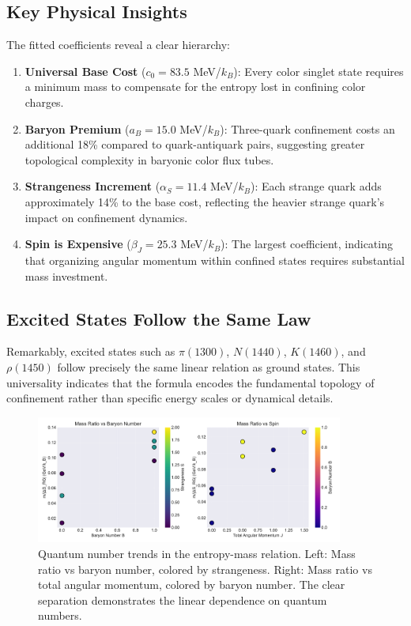 \documentclass[12pt,a4paper]{article}
\begin{document}
\subsection{Key Physical Insights}

The fitted coefficients reveal a clear hierarchy:

\begin{enumerate}
\item \textbf{Universal Base Cost} ($c_0 = 83.5$ MeV/$k_B$): Every color singlet state requires a minimum mass to compensate for the entropy lost in confining color charges.

\item \textbf{Baryon Premium} ($a_B = 15.0$ MeV/$k_B$): Three-quark confinement costs an additional 18\% compared to quark-antiquark pairs, suggesting greater topological complexity in baryonic color flux tubes.

\item \textbf{Strangeness Increment} ($\alpha_S = 11.4$ MeV/$k_B$): Each strange quark adds approximately 14\% to the base cost, reflecting the heavier strange quark's impact on confinement dynamics.

\item \textbf{Spin is Expensive} ($\beta_J = 25.3$ MeV/$k_B$): The largest coefficient, indicating that organizing angular momentum within confined states requires substantial mass investment.
\end{enumerate}

\subsection{Excited States Follow the Same Law}

Remarkably, excited states such as $\pi(1300)$, $N(1440)$, $K(1460)$, and $\rho(1450)$ follow precisely the same linear relation as ground states. This universality indicates that the formula encodes the fundamental topology of confinement rather than specific energy scales or dynamical details.

\begin{figure}[H]
\centering
\includegraphics[width=0.9\textwidth]{quantum_trends.pdf}
\caption{Quantum number trends in the entropy-mass relation. Left: Mass ratio vs baryon number, colored by strangeness. Right: Mass ratio vs total angular momentum, colored by baryon number. The clear separation demonstrates the linear dependence on quantum numbers.}
\label{fig:trends}
\end{figure}
\end{document}
